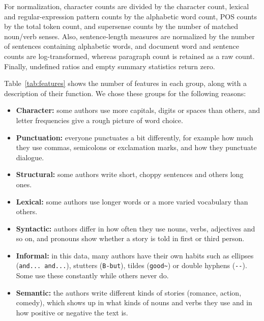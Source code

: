 \documentclass[11pt,twocolumn]{article}
\begin{document}
For normalization, character counts are divided by the character count, lexical and regular-expression pattern counts by the alphabetic word count, POS counts by the total token count, and supersense counts by the number of matched noun/verb senses. Also, sentence-length measures are normalized by the number of sentences containing alphabetic words, and document word and sentence counts are log-transformed, whereas paragraph count is retained as a raw count. Finally, undefined ratios and empty summary statistics return zero.

Table~\ref{tab:features} shows the number of features in each group, along with a description of their function. We chose these groups for the following reasons:
\begin{itemize}
    \item \textbf{Character:} some authors use more capitals, digits or spaces than others, and letter frequencies give a rough picture of word choice.
    \item \textbf{Punctuation:} everyone punctuates a bit differently, for example how much they use commas, semicolons or exclamation marks, and how they punctuate dialogue.
    \item \textbf{Structural:} some authors write short, choppy sentences and others long ones.
    \item \textbf{Lexical:} some authors use longer words or a more varied vocabulary than others.
    \item \textbf{Syntactic:} authors differ in how often they use nouns, verbs, adjectives and so on, and pronouns show whether a story is told in first or third person.
    \item \textbf{Informal:} in this data, many authors have their own habits such as ellipses (\texttt{and... and...}), stutters (\texttt{B-but}), tildes (\texttt{good\textasciitilde}) or double hyphens (\texttt{-{}-}). Some use these constantly while others never do.
    \item \textbf{Semantic:} the authors write different kinds of stories (romance, action, comedy), which shows up in what kinds of nouns and verbs they use and in how positive or negative the text is.
\end{itemize}
\end{document}
